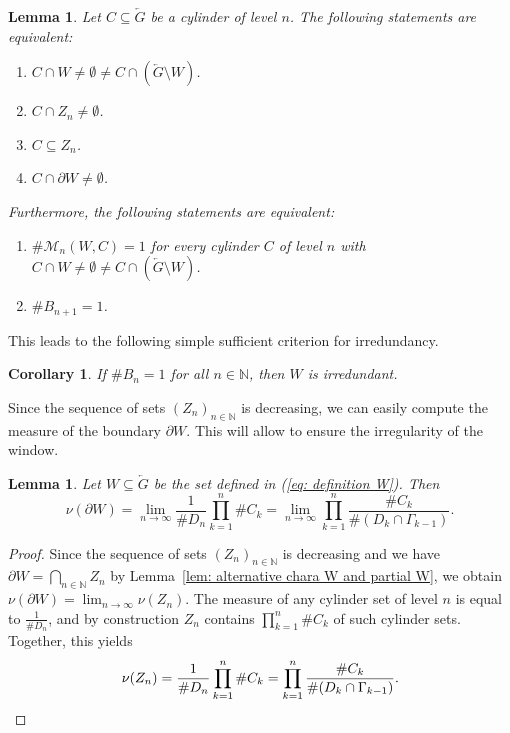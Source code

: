 \documentclass[titlepage,reqno,10pt]{amsart}
\newtheorem{lemma}[theorem]{Lemma}
\newtheorem{corollary}[theorem]{Corollary}
\theoremstyle{definition}
\def\N{{\mathbb N}}
\newcommand{\tm}{\subseteq}
\begin{document}
\begin{lemma}\label{lem: chara nonempty intersect with W and complement}
    Let $C\tm \overleftarrow{G}$ be a cylinder of level $n$.
    The following statements are equivalent:
    \begin{enumerate}
        \item $C\cap W\neq \emptyset \neq  C\cap (\overleftarrow{G}\setminus W)$.
        \item $C\cap Z_n \neq \emptyset$.
        \item $C\tm Z_n$.
        \item $C\cap \partial W\neq \emptyset$.
    \end{enumerate}
    Furthermore, the following statements are equivalent:
    \begin{enumerate}
        \item $\#\mathcal{M}_n(W,C)=1$ for every cylinder $C$ of level $n$ with $C\cap W\neq \emptyset \neq  C\cap (\overleftarrow{G}\setminus W)$.
        \item $\# B_{n+1} =1$.
    \end{enumerate}
\end{lemma}

This leads to the following simple sufficient criterion for irredundancy.
\begin{corollary}\label{cor: suff crit irredundancy}
    If $\#B_n= 1$ for all $n\in\N$, then $W$ is irredundant.
\end{corollary}

Since the sequence of sets $(Z_n)_{n\in\mathbb{N}}$ is decreasing, we can easily compute the measure of the boundary $\partial W$. This will allow to ensure the irregularity of the window. 

\begin{lemma}\label{lem: measure of boundary}
    Let $W\subseteq \overleftarrow{G}$ be the set defined in (\ref{eq: definition W}). Then
    $$\nu(\partial W) = \lim_{n\to\infty} \frac{1}{\# D_n} \prod_{k=1}^n \# C_k = \lim_{n\to\infty} \prod_{k=1}^n \frac{\# C_k}{\#( D_k \cap \Gamma_{k-1})}.$$
\end{lemma}
\begin{proof}
Since the sequence of sets $(Z_n)_{n\in\mathbb{N}}$ is decreasing and we have $\partial W=\bigcap_{n\in\N} Z_n$ by  Lemma~\ref{lem: alternative chara W and partial W}, we obtain $\nu(\partial W)=\lim_{n\to \infty}\nu(Z_n)$. The measure of any cylinder set of level $n$ is equal to $\frac{1}{\#D_n}$, and by construction $Z_n$ contains $\prod_{k=1}^n \# C_k$ of such cylinder sets. Together, this yields 
\[
\nu(Z_n)=\frac{1}{\#D_n}\prod_{k=1}^n\#C_k=\prod_{k=1}^n\frac{\#C_k}{\#(D_k\cap \Gamma_{k-1})}.  \qedhere
\]
\end{proof}
\end{document}
